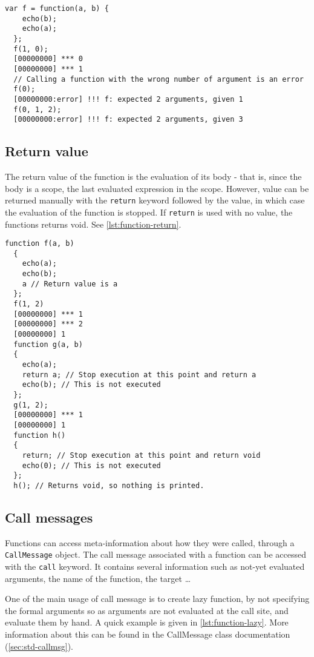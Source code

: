 \documentclass[openright,twoside,12pt]{report}
\begin{document}
\begin{lstlisting}[caption=Storing and calling
  functions,label=lst:function-args,float=\floatpos]
  var f = function(a, b) {
    echo(b);
    echo(a);
  };
  f(1, 0);
  [00000000] *** 0
  [00000000] *** 1
  // Calling a function with the wrong number of argument is an error
  f(0);
  [00000000:error] !!! f: expected 2 arguments, given 1
  f(0, 1, 2);
  [00000000:error] !!! f: expected 2 arguments, given 3
\end{lstlisting}

\subsection{Return value}

The return value of the function is the evaluation of its body - that
is, since the body is a scope, the last evaluated expression in the
scope. However, value can be returned manually with the
\lstinline|return| keyword followed by the value, in which case the
evaluation of the function is stopped. If \lstinline|return| is used
with no value, the functions returns void. See \autoref{lst:function-return}.

\begin{lstlisting}[caption=Returning values from functions,
  label=lst:function-return,float=\floatpos]
  function f(a, b)
  {
    echo(a);
    echo(b);
    a // Return value is a
  };
  f(1, 2)
  [00000000] *** 1
  [00000000] *** 2
  [00000000] 1
  function g(a, b)
  {
    echo(a);
    return a; // Stop execution at this point and return a
    echo(b); // This is not executed
  };
  g(1, 2);
  [00000000] *** 1
  [00000000] 1
  function h()
  {
    return; // Stop execution at this point and return void
    echo(0); // This is not executed
  };
  h(); // Returns void, so nothing is printed.
\end{lstlisting}

\subsection{Call messages}
\label{sec:us-fun-callmsg}

Functions can access meta-information about how they were called,
through a \lstinline|CallMessage| object. The call message associated
with a function can be accessed with the \lstinline|call| keyword. It
contains several information such as not-yet evaluated arguments, the
name of the function, the target \ldots

One of the main usage of call message is to create lazy function, by
not specifying the formal arguments so as arguments are not evaluated
at the call site, and evaluate them by hand. A quick example is given
in \autoref{lst:function-lazy}. More information about this can be found in
the CallMessage class documentation (\autoref{sec:std-callmsg}).
\end{document}
